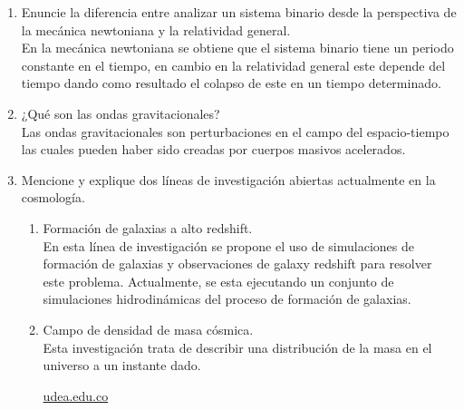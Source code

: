 \documentclass[12pt,letterpaper]{report}
\begin{document}
\begin{enumerate}
    \item Enuncie la diferencia entre analizar un sistema binario desde la perspectiva de la mecánica newtoniana y la relatividad general.\\
    En la mecánica newtoniana se obtiene que el sistema binario tiene un periodo constante en el tiempo, en cambio en la relatividad general este depende del tiempo dando como resultado el colapso de este en un tiempo determinado.
    \item ¿Qué son las ondas gravitacionales?\\
    Las ondas gravitacionales son perturbaciones en el campo del espacio-tiempo las cuales pueden haber sido creadas por cuerpos masivos acelerados.
    \item Mencione y explique dos líneas de investigación abiertas actualmente en la cosmología.
    \begin{enumerate}
        \item Formación de galaxias a alto redshift.\\
        En esta línea de investigación se propone el uso de simulaciones de formación de galaxias y observaciones de galaxy redshift para resolver este problema. Actualmente, se esta ejecutando un conjunto de simulaciones hidrodinámicas del proceso de formación de galaxias.
        \item Campo de densidad de masa cósmica.\\
        Esta investigación trata de describir una distribución de la masa en el universo a un instante dado.\\
        \begin{center}
        \href{http://www.udea.edu.co/wps/portal/udea/web/inicio/investigacion/grupos-investigacion/ciencias-naturales-exactas/facom/lineas-investigacion}{udea.edu.co}
        \end{center}
        
    \end{enumerate}
\end{enumerate}
\end{document}
